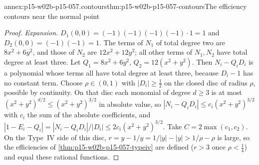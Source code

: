 \begin{annexitem}{annex:p15-w02b-p15-057.contours}{thm:p15-w02b-p15-057-contours}{The efficiency contours near the normal point}
\begin{proof}
\emph{Expansion.} \(D_1(0,0)=(-1)(-1)(-1)(-1)\cdot1=1\) and
\(D_2(0,0)=(-1)(-1)=1\). The terms of \(N_1\) of total degree two are
\(8x^2+6y^2\), and those of \(N_2\) are \(12x^2+12y^2\); all other terms of
\(N_1,N_2\) have total degree at least three. Let \(Q_1=8x^2+6y^2\),
\(Q_2=12(x^2+y^2)\). Then \(N_i-Q_iD_i\) is a polynomial whose terms all
have total degree at least three, because \(D_i-1\) has no constant term.
Choose \(\rho\in(0,1)\) with \(|D_i|\geq\frac12\) on the closed disc of
radius \(\rho\), possible by continuity. On that disc each monomial of
degree \(d\geq3\) is at most \((x^2+y^2)^{d/2}\leq(x^2+y^2)^{3/2}\) in
absolute value, so \(|N_i-Q_iD_i|\leq c_i(x^2+y^2)^{3/2}\) with \(c_i\) the
sum of the absolute coefficients, and
\(|1-E_i-Q_i|=|N_i-Q_iD_i|/|D_i|\leq2c_i(x^2+y^2)^{3/2}\). Take
\(C=2\max(c_1,c_2)\). On the Type~IV side of this disc, \(r=y-1/y=1/|y|-|y|>1/\rho-\rho\)
is large, so the efficiencies of \cref{thm:p15-w02b-p15-057-typeiv} are
defined (\(r>3\) once \(\rho<\frac14\)) and equal these rational functions.
\end{proof}
\end{annexitem}

